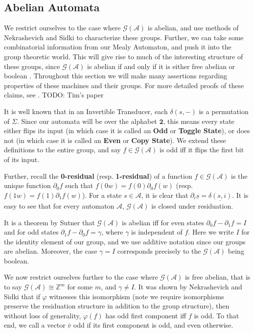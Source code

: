 \documentclass[12pt]{article}
\newcommand{\A}{\mathcal{A}}
\newcommand{\G}{\mathcal{G}}
\newcommand{\Z}{\mathbb{Z}}
\newcommand{\2}{\textbf{2}}
\newcommand{\del}{\partial}
\renewcommand{\v}{\bar{v}}
\begin{document}
\subsection{Abelian Automata}
We restrict ourselves to the case where $\G(\A)$ is abelian, 
and use methods of Nekrashevich and Sidki to characterize these groups.
Further, we can take some combinatorial information from our Mealy 
Automaton, and push it into the group theoretic world. This will give
rise to much of the interesting structure of these groups, since
$\G(\A)$ is abelian if and only if it is either free abelian or 
boolean \cite{NekrashevychSidki04:automorphisms}.
Throughout this section we will make many assertions regarding properties
of these machines and their groups. For more detailed proofs of these 
claims, see 
\cite{Nekrashevych05:self_similar_groups%
     ,GrigorchukNS00:automata_groups%
     ,Sidki00:one_rooted_trees%
     ,SutnerLewi12:iter_inver_bin_trans%
     ,Okano15:thesis%
     ,Sutner18:abelian_automata%
     }.
     TODO: Tim's paper

It is well known that in an Invertible Transducer, each $\delta(s,-)$
is a permutation of $\Sigma$. Since our automata will be over the alphabet
$\2$, this means every state either flips its input 
(in which case it is called an \textbf{Odd} or \textbf{Toggle State}), 
or does not
(in which case it is called an \textbf{Even} or \textbf{Copy State}).
We extend these definitions to the entire group, and say $f \in \G(\A)$ 
is odd iff it flips the first bit of its input.

Further, recall the \textbf{0-residual} (resp. \textbf{1-residual}) of a 
function $f \in \G(\A)$ is the unique function 
$\del_0 f$ such that $f(0w) = f(0) \del_0 f(w)$ 
(resp. $f(1w) = f(1) \del_1 f(w)$). 
For a state $s \in \A$, it is clear that 
$\del_i \underline{s} = \underline{\delta(s,i)}$.
It is easy to see that for every automaton $\A$, $\G(\A)$ is closed
under residuation.

It is a theorem by Sutner \cite{Sutner18:abelian_automata} 
that $\G(\A)$ is abelian iff for even states $\del_0 f - \del_1 f = I$ 
and for odd states $\del_1 f - \del_0 f = \gamma$, where $\gamma$ is 
independent of $f$. Here we write $I$ for the identity element of our group,
and we use additive notation since our groups are abelian.
Moreover, the case $\gamma = I$ corresponds precisely to the $\G(\A)$
being boolean.

We now restrict ourselves further to the case where $\G(\A)$ is 
free abelian, that is to say $\G(\A) \cong \Z^m$ for some $m$,
and $\gamma \not = I$.
It was shown by Nekrashevich and Sidki 
\cite{NekrashevychSidki04:automorphisms} that if $\varphi$ witnesses this 
isomorphism (note we require isomorphisms preserve the residuation structure
in addition to the group structure), then without loss of generality, 
$\varphi(f)$ has odd first component iff $f$ is odd. 
To that end, we call a vector $\v$ odd if its first component is odd, 
and even otherwise.
\end{document}
